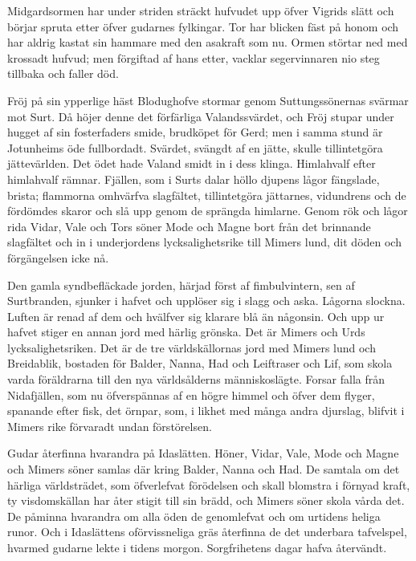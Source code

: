 Midgardsormen har under striden sträckt hufvudet upp öfver Vigrids slätt
och börjar spruta etter öfver gudarnes fylkingar. Tor har blicken fäst
på honom och har aldrig kastat sin hammare med den asakraft som nu.
Ormen störtar ned med krossadt hufvud; men förgiftad af hans etter,
vacklar segervinnaren nio steg tillbaka och faller död.

Fröj på sin ypperlige häst Blodughofve stormar genom Suttungssönernas
svärmar mot Surt. Då höjer denne det förfärliga Valandssvärdet, och Fröj
stupar under hugget af sin fosterfaders smide, brudköpet för Gerd; men i
samma stund är Jotunheims öde fullbordadt. Svärdet, svängdt af en jätte,
skulle tillintetgöra jättevärlden. Det ödet hade Valand smidt in i dess
klinga. Himlahvalf efter himlahvalf rämnar. Fjällen, som i Surts dalar
höllo djupens lågor fängslade, brista; flammorna omhvärfva slagfältet,
tillintetgöra jättarnes, vidundrens och de fördömdes skaror och slå upp
genom de sprängda himlarne. Genom rök och lågor rida Vidar, Vale och
Tors söner Mode och Magne bort från det brinnande slagfältet och in i
underjordens lycksalighetsrike till Mimers lund, dit döden och
förgängelsen icke nå.

Den gamla syndbefläckade jorden, härjad först af fimbulvintern, sen af
Surtbranden, sjunker i hafvet och upplöser sig i slagg och aska. Lågorna
slockna. Luften är renad af dem och hvälfver sig klarare blå än
någonsin. Och upp ur hafvet stiger en annan jord med härlig grönska. Det
är Mimers och Urds lycksalighetsriken. Det är de tre världskällornas
jord med Mimers lund och Breidablik, bostaden för Balder, Nanna, Had och
Leiftraser och Lif, som skola varda föräldrarna till den nya
världsålderns människoslägte. Forsar falla från Nidafjällen, som nu
öfverspännas af en högre himmel och öfver dem flyger, spanande efter
fisk, det örnpar,
\protect\hypertarget{lb1625905.xhtmlux5cux23start197}{}{}\protect\hypertarget{lb1625905.xhtmlux5cux23start197-a}{}{}\protect\hypertarget{lb1625905.xhtmlux5cux23start197-b}{}{}\protect\hypertarget{lb1625905.xhtmlux5cux23start197-c}{}{}\protect\hypertarget{lb1625905.xhtmlux5cux23start197-d}{}{}
som, i likhet med många andra djurslag, blifvit i Mimers rike förvaradt
undan förstörelsen.

Gudar återfinna hvarandra på Idaslätten. Höner, Vidar, Vale, Mode och
Magne och Mimers söner samlas där kring Balder, Nanna och Had. De
samtala om det härliga världsträdet, som öfverlefvat förödelsen och
skall blomstra i förnyad kraft, ty visdomskällan har åter stigit till
sin brädd, och Mimers söner skola vårda det. De påminna hvarandra om
alla öden de genomlefvat och om urtidens heliga runor. Och i Idaslättens
oförvissneliga gräs återfinna de det underbara tafvelspel, hvarmed
gudarne lekte i tidens morgon. Sorgfrihetens dagar hafva återvändt.

